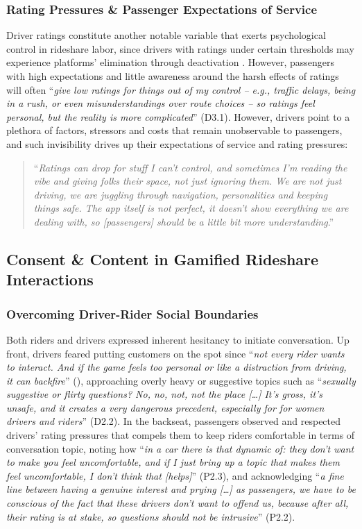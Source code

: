\subsubsection{Rating Pressures \& Passenger Expectations of Service} \label{ratings}
Driver ratings constitute another notable variable that exerts psychological control in rideshare labor, since drivers with ratings under certain thresholds may experience platforms' elimination through deactivation \cite{free}. 
However, passengers with high expectations and little awareness around the harsh effects of ratings will often ``\textit{give low ratings for things out of my control -- e.g., traffic delays, being in a rush, or even misunderstandings over route choices -- so ratings feel personal, but the reality is more complicated}'' (D3.1). However, drivers point to a plethora of factors, stressors and costs that remain unobservable to passengers, and such invisibility drives up their expectations of service and rating pressures: 

\begin{quote}
    ``\textit{Ratings can drop for stuff I can't control, and sometimes I'm reading the vibe and giving folks their space, not just ignoring them. We are not just driving, we are juggling through navigation, personalities and keeping things safe. The app itself is not perfect, it doesn't show everything we are dealing with, so [passengers] should be a little bit more understanding}.''
\end{quote}


\subsection{Consent \& Content in Gamified Rideshare Interactions}

\subsubsection{Overcoming Driver-Rider Social Boundaries} Both riders and drivers expressed inherent hesitancy to initiate conversation. Up front, drivers feared putting customers on the spot since ``\textit{not every rider wants to interact. And if the game feels too personal or like a distraction from driving, it can backfire}'' (), approaching overly heavy or suggestive topics such as ``\textit{sexually suggestive or flirty questions? No, no, not, not the place [\dots] It's gross, it's unsafe, and it creates a very dangerous precedent, especially for for women drivers and riders}'' (D2.2). In the backseat, passengers observed and respected drivers' rating pressures that compels them to keep riders comfortable in terms of conversation topic, noting how ``\textit{in a car there is that dynamic of: they don't want to make you feel uncomfortable, and if I just bring up a topic that makes them feel uncomfortable, I don't think that [helps]}'' (P2.3), and acknowledging ``\textit{a fine line between having a genuine interest and prying [\dots] as passengers, we have to be conscious of the fact that these drivers don't want to offend us, because after all, their rating is at stake, so questions should not be intrusive}'' (P2.2).

